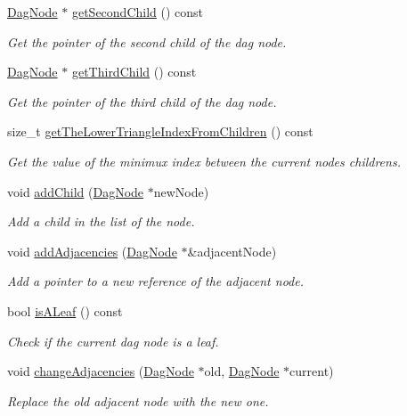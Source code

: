 \begin{DoxyCompactItemize}
\hyperlink{classDagNode}{Dag\+Node} $\ast$ \hyperlink{classDagNode_a301eaa7093739ce7892020a2a4c32cfd}{get\+Second\+Child} () const
\begin{DoxyCompactList}\small\item\em Get the pointer of the second child of the dag node. \end{DoxyCompactList}\item 
\hyperlink{classDagNode}{Dag\+Node} $\ast$ \hyperlink{classDagNode_a6a7af1fc33b66e3a22ebcf1b7da4f482}{get\+Third\+Child} () const
\begin{DoxyCompactList}\small\item\em Get the pointer of the third child of the dag node. \end{DoxyCompactList}\item 
size\+\_\+t \hyperlink{classDagNode_a218a3940da0ecb136be52c7871251540}{get\+The\+Lower\+Triangle\+Index\+From\+Children} () const
\begin{DoxyCompactList}\small\item\em Get the value of the minimux index between the current node\textquotesingle{}s childrens. \end{DoxyCompactList}\item 
void \hyperlink{classDagNode_addfd2cfc5237217967c418bf72fd7f3e}{add\+Child} (\hyperlink{classDagNode}{Dag\+Node} $\ast$new\+Node)
\begin{DoxyCompactList}\small\item\em Add a child in the list of the node. \end{DoxyCompactList}\item 
void \hyperlink{classDagNode_a106926f7429347b10746b66039b1609b}{add\+Adjacencies} (\hyperlink{classDagNode}{Dag\+Node} $\ast$\&adjacent\+Node)
\begin{DoxyCompactList}\small\item\em Add a pointer to a new reference of the adjacent node. \end{DoxyCompactList}\item 
bool \hyperlink{classDagNode_af3ed3a5eed4cb9bf04ec6ad9b6877cce}{is\+A\+Leaf} () const
\begin{DoxyCompactList}\small\item\em Check if the current dag node is a leaf. \end{DoxyCompactList}\item 
void \hyperlink{classDagNode_a5f70b777657539694e124557fcd35be1}{change\+Adjacencies} (\hyperlink{classDagNode}{Dag\+Node} $\ast$old, \hyperlink{classDagNode}{Dag\+Node} $\ast$current)
\begin{DoxyCompactList}\small\item\em Replace the old adjacent node with the new one. \end{DoxyCompactList}\end{DoxyCompactItemize}
